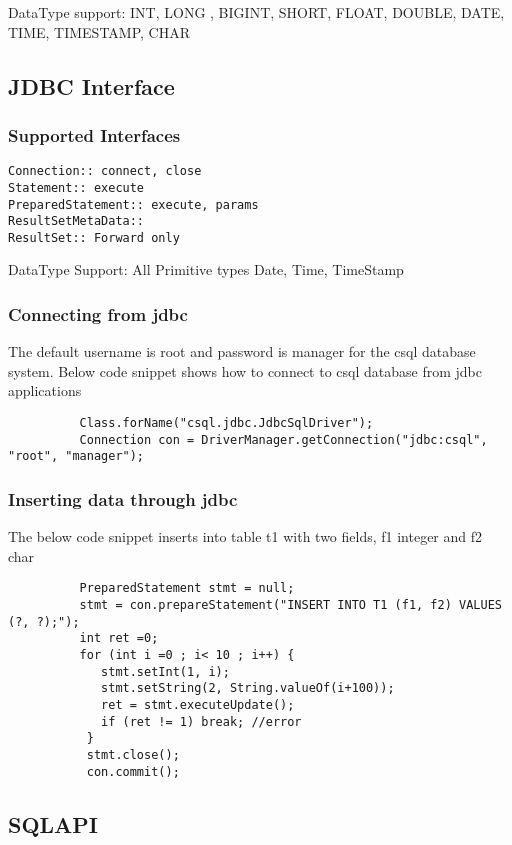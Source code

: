 \documentclass[12pt]{article}
\begin{document}
DataType support:
INT, LONG , BIGINT, SHORT, 
FLOAT,  DOUBLE, 
DATE, TIME,  TIMESTAMP, 
CHAR 


\subsection{JDBC Interface }
\label{JDBC Interface }
\subsubsection{Supported Interfaces}
\label{supportedInterfaces}
\begin{verbatim}
Connection:: connect, close
Statement:: execute
PreparedStatement:: execute, params
ResultSetMetaData::
ResultSet:: Forward only
\end{verbatim}


DataType Support:
All Primitive types
Date, Time, TimeStamp

\subsubsection{Connecting from jdbc}
\label{jdbcconnect}
The default username is root and password is manager for the csql database system. Below code snippet shows how to connect to csql database from jdbc applications \\
\begin{verbatim}
          Class.forName("csql.jdbc.JdbcSqlDriver");
          Connection con = DriverManager.getConnection("jdbc:csql", "root", "manager");
\end{verbatim}

\subsubsection{Inserting data through jdbc}
\label{jdbcinsert}
 The below code snippet inserts into table t1 with two fields, f1 integer and f2 char \\
\begin{verbatim}
          PreparedStatement stmt = null;
          stmt = con.prepareStatement("INSERT INTO T1 (f1, f2) VALUES (?, ?);");
          int ret =0;
          for (int i =0 ; i< 10 ; i++) {
             stmt.setInt(1, i);
             stmt.setString(2, String.valueOf(i+100));
             ret = stmt.executeUpdate();
             if (ret != 1) break; //error
           }
           stmt.close();
           con.commit();
\end{verbatim}

\subsection{SQLAPI }
\label{SQLAPI }
\end{document}
